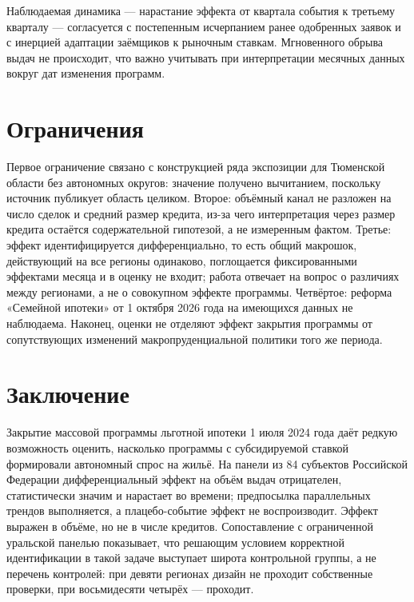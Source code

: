 \documentclass[
  russian,
  11pt,
]{article}
\begin{document}
Наблюдаемая динамика --- нарастание эффекта от квартала события к
третьему кварталу --- согласуется с постепенным исчерпанием ранее
одобренных заявок и с инерцией адаптации заёмщиков к рыночным ставкам.
Мгновенного обрыва выдач не происходит, что важно учитывать при
интерпретации месячных данных вокруг дат изменения программ.

\section{Ограничения}\label{ux43eux433ux440ux430ux43dux438ux447ux435ux43dux438ux44f}

Первое ограничение связано с конструкцией ряда экспозиции для Тюменской
области без автономных округов: значение получено вычитанием, поскольку
источник публикует область целиком. Второе: объёмный канал не разложен
на число сделок и средний размер кредита, из-за чего интерпретация через
размер кредита остаётся содержательной гипотезой, а не измеренным
фактом. Третье: эффект идентифицируется дифференциально, то есть общий
макрошок, действующий на все регионы одинаково, поглощается
фиксированными эффектами месяца и в оценку не входит; работа отвечает на
вопрос о различиях между регионами, а не о совокупном эффекте программы.
Четвёртое: реформа «Семейной ипотеки» от 1 октября 2026 года на
имеющихся данных не наблюдаема. Наконец, оценки не отделяют эффект
закрытия программы от сопутствующих изменений макропруденциальной
политики того же периода.

\section{Заключение}\label{ux437ux430ux43aux43bux44eux447ux435ux43dux438ux435}

Закрытие массовой программы льготной ипотеки 1 июля 2024 года даёт
редкую возможность оценить, насколько программы с субсидируемой ставкой
формировали автономный спрос на жильё. На панели из 84 субъектов
Российской Федерации дифференциальный эффект на объём выдач отрицателен,
статистически значим и нарастает во времени; предпосылка параллельных
трендов выполняется, а плацебо-событие эффект не воспроизводит. Эффект
выражен в объёме, но не в числе кредитов. Сопоставление с ограниченной
уральской панелью показывает, что решающим условием корректной
идентификации в такой задаче выступает широта контрольной группы, а не
перечень контролей: при девяти регионах дизайн не проходит собственные
проверки, при восьмидесяти четырёх --- проходит.
\end{document}
